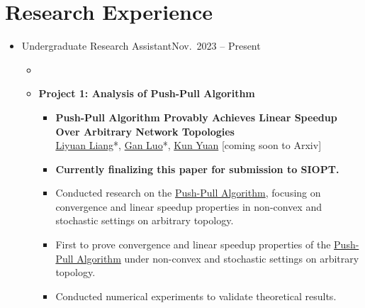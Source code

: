 \section{Research Experience}
\begin{itemize}
    \item {}
          {Undergraduate Research Assistant}{Nov.\ 2023 -- Present}
          \begin{itemize}
              \item {}
              
              \item \textbf{Project 1: Analysis of Push-Pull Algorithm}
              \begin{itemize}
              \item \textbf{Push-Pull Algorithm Provably Achieves Linear
Speedup Over Arbitrary Network Topologies}\\
\href{https://lavaei.ieor.berkeley.edu/Group.html}{Liyuan Liang}*, \underline{Gan Luo}*,  \href{https://kunyuan827.github.io}{Kun Yuan} [coming soon to Arxiv]
                  \item {\textbf{Currently finalizing this paper for submission to SIOPT.}}
                  \item {Conducted research on the \href{https://arxiv.org/pdf/1810.06653v4}{Push-Pull Algorithm}, focusing on convergence and linear speedup properties in non-convex and stochastic settings on arbitrary topology.}
                  \item First to prove convergence and linear speedup properties of the \href{https://arxiv.org/pdf/1810.06653v4}{Push-Pull Algorithm} under non-convex and stochastic settings  on arbitrary topology.
                  \item Conducted numerical experiments to validate theoretical results.
              \end{itemize}
              

\end{itemize}
\end{itemize}
